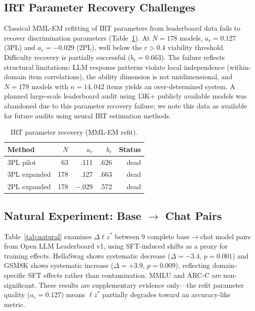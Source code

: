 \documentclass[11pt,twocolumn]{article}
\newcommand{\lzs}{\ensuremath{\ell z^*}}
\begin{document}
\subsection{IRT Parameter Recovery Challenges}
\label{sec:empirical}

Classical MML-EM refitting of IRT parameters from leaderboard data fails to recover discrimination parameters (Table~\ref{tab:refit}). At $N = 178$ models, $a_r = 0.127$ (3PL) and $a_r = -0.029$ (2PL), well below the $r > 0.4$ viability threshold. Difficulty recovery is partially successful ($b_r = 0.663$). The failure reflects structural limitations: LLM response patterns violate local independence (within-domain item correlations), the ability dimension is not unidimensional, and $N = 178$ models with $n = 14{,}042$ items yields an over-determined system. A planned large-scale leaderboard audit using 13K+ publicly available models was abandoned due to this parameter recovery failure; we note this data as available for future audits using neural IRT estimation methods.

\begin{table}[t]
\centering
\caption{IRT parameter recovery (MML-EM refit).}
\label{tab:refit}
\footnotesize
\begin{tabular}{lrrrr}
\toprule
Method & $N$ & $a_r$ & $b_r$ & Status \\
\midrule
3PL pilot & 63 & .111 & .626 & dead \\
3PL expanded & 178 & .127 & .663 & dead \\
2PL expanded & 178 & $-$.029 & .572 & dead \\
\bottomrule
\end{tabular}
\vspace{-0.3cm}
\end{table}

\subsection{Natural Experiment: Base $\to$ Chat Pairs}

Table~\ref{tab:natural} examines $\Delta\lzs$ between 9 complete base$\to$chat model pairs from Open LLM Leaderboard v1, using SFT-induced shifts as a proxy for training effects. HellaSwag shows systematic decrease ($\Delta = -3.4$, $p = 0.001$) and GSM8K shows systematic increase ($\Delta = +3.9$, $p = 0.009$), reflecting domain-specific SFT effects rather than contamination. MMLU and ARC-C are non-significant. These results are supplementary evidence only---the refit parameter quality ($a_r = 0.127$) means $\lzs$ partially degrades toward an accuracy-like metric.
\end{document}
